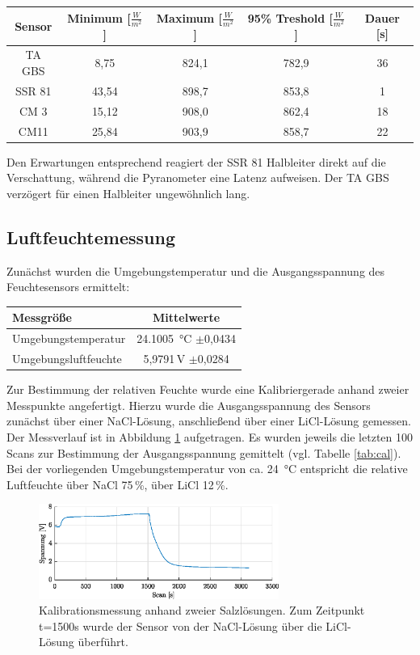 \begin{center}
	\begin{tabular}{c|c|c|c|c}
		\label{tab:response}
		
		\textbf{Sensor} & \textbf{Minimum} [$\frac{W}{m^2}$] & \textbf{Maximum} [$\frac{W}{m^2}$]& \textbf{95\% Treshold} [$\frac{W}{m^2}$] & \textbf{Dauer} [s]\\
		\hline
		TA GBS & 8,75 & 824,1 & 782,9 & 36 \\
		SSR 81 & 43,54 & 898,7 & 853,8 & 1 \\
		CM 3 & 15,12 & 908,0 & 862,4 & 18 \\
		CM11 & 25,84 & 903,9 & 858,7 & 22 \\
	\end{tabular}
\end{center}
Den Erwartungen entsprechend reagiert der SSR 81 Halbleiter direkt auf die Verschattung, während die Pyranometer eine Latenz aufweisen. Der TA GBS verzögert für einen Halbleiter ungewöhnlich lang.

\subsection{Luftfeuchtemessung}
Zunächst wurden die Umgebungstemperatur und die Ausgangsspannung des Feuchtesensors ermittelt:
\begin{center}
	\begin{tabular}{l|c}
		\label{tab:amb}
		
		\textbf{Messgröße} & \textbf{Mittelwerte}\\
		\hline
		Umgebungstemperatur & \SI{24,1005}{\celsius} $\pm$0,0434\\
		Umgebungsluftfeuchte & 5,9791\,V $\pm$0,0284
	\end{tabular}
\end{center}

Zur Bestimmung der relativen Feuchte wurde eine Kalibriergerade anhand zweier Messpunkte angefertigt. Hierzu wurde die Ausgangsspannung des Sensors zunächst über einer NaCl-Lösung, anschließend über einer LiCl-Lösung gemessen. Der Messverlauf ist in Abbildung \ref{fig:cal} aufgetragen. Es wurden jeweils die letzten 100 Scans zur Bestimmung der Ausgangsspannung gemittelt (vgl. Tabelle \ref{tab:cal}). Bei der vorliegenden Umgebungstemperatur von ca. \SI{24}{\celsius} entspricht die relative Luftfeuchte über NaCl 75\,\%, über LiCl 12\,\%. 

\begin{figure}[H]
	\centering
	\includegraphics[width=0.7\textwidth]{../DATA/Messreihe_Feuchtekalibration.eps}
	\caption[Kalibrationsmessung]{Kalibrationsmessung anhand zweier Salzlösungen. Zum Zeitpunkt t=1500s wurde der Sensor von der NaCl-Lösung über die LiCl-Lösung überführt.}
	\label{fig:cal}
\end{figure}

